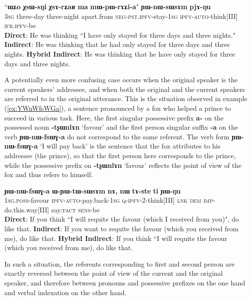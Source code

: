 \documentclass[oneside,a4paper,11pt]{article}
\newcommand{\ipa}[1]{\textbf{\phon#1}} %
\newcommand{\jpg}[2]{\ipa{#1} `#2'} %
\newcommand{\bleu}[1]{{\color{blue}#1}}
\newcommand{\rouge}[1]{{\color{red}#1}}
\newcommand{\refb}[1]{(\ref{#1})}
\begin{document}
\begin{exe}
\ex \label{ex:mWpWrAZia}
\gll  ``\bleu{\ipa{ɯʑo}}  	\ipa{χsɯ-sŋi}  	\ipa{χsɤ-rʑaʁ}  	\ipa{ma}  	\rouge{\ipa{mɯ-pɯ-rɤʑi-a}}"  	\ipa{ɲɯ-nɯ-sɯsɤm}  	\ipa{pjɤ-ŋu}  \\
{\textsc{3sg}} three-day  three-night apart.from {\textsc{neg-pst.ipfv}-stay-\textsc{1sg}} \textsc{ipfv-auto}-think[III] \textsc{ifr.ipfv}-be \\
\glt    \textbf{Direct}: He was thinking ``\bleu{I {have} only {stayed} for three days and three nights.}"
\glt    \textbf{Indirect}: He was thinking that \rouge{he had only stayed for three days and three nights}.
\glt  \textbf{Hybrid Indirect}: He was thinking that \rouge{he} \bleu{have} only {stayed} for three days and three nights. 
\end{exe}
  

A potentially even more confusing case occurs when the original speaker is the current speakers' addressee, and when both the original and the current speakers are referred to in the original utterance. This is the situation observed in example \refb{ex:YWnWfsWGa}, a sentence pronounced by a fox who helped a prince to succeed in various task. Here,  the first singular possessive prefix \ipa{a-} on the possessed noun \jpg{-tʂɯnlɤn}{favour} and the first person singular suffix \ipa{-a} on the verb \ipa{ɲɯ-nɯ-fsɯɣ-a} do not correspond to the same referent. The verb form \ipa{ɲɯ-nɯ-fsɯɣ-a} `I will pay back' is the sentence that the fox attributes to his addressee (the prince), so that the first person here corresponds to the prince, while the possessive prefix on \jpg{-tʂɯnlɤn}{favour} reflects the point of view of the fox and thus refers to himself.

 \begin{exe}
 \ex \label{ex:YWnWfsWGa}
 \gll   \rouge{\ipa{a-tʂɯnlɤn}}  	\bleu{\ipa{ɲɯ-nɯ-fsɯɣ-a}}  	\ipa{ɯ-ɲɯ-tɯ-sɯsɤm}  	\ipa{nɤ,}  	\ipa{nɯ}  	\ipa{tɤ-ste}  	\ipa{ti}  \ipa{ɲɯ-ŋu} \\
  {\textsc{1sg.poss}-favour} {\textsc{ipfv-auto}-pay.back-\textsc{1sg}} \textsc{q-ipfv}-2-think[III] \textsc{lnk} \textsc{dem} \textsc{imp}-do.this.way[III] say:\textsc{fact} \textsc{sens}-be \\
  \glt    \textbf{Direct}: If you think ``\bleu{I will requite the favour (which I received from you)}", do like that.
 \glt    \textbf{Indirect}: If you want to \rouge{requite the favour (which you received from me}), do like that.
 \glt   \textbf{Hybrid Indirect}: If you think ``\bleu{I} will requite the \rouge{favour (which you received from me}), do like that.
   \end{exe}
In such a situation, the referents corresponding to first and second person are exactly reversed between the point of view of the current and the original speaker, and therefore between pronouns and possessive prefixes on the one hand and verbal indexation on the other hand.
   
\end{document}
